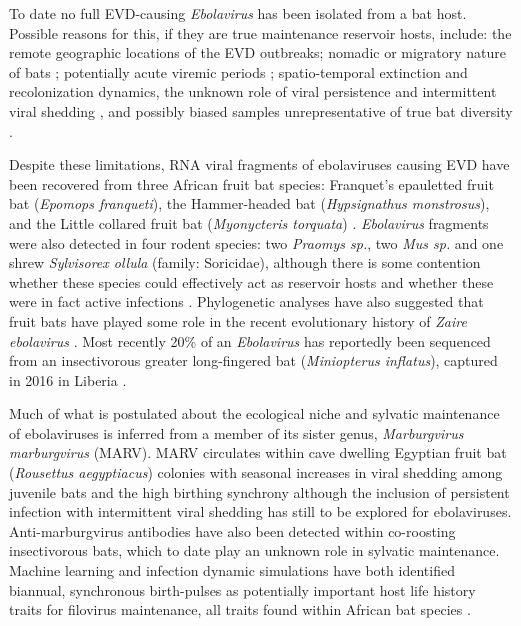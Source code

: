 \documentclass[a4paper,twoside, onecolumn]{article}
\begin{document}
	To date no full EVD-causing \textit{Ebolavirus} has been isolated from a bat host. Possible reasons for this, if they are true maintenance reservoir hosts, include: the remote geographic locations of the EVD outbreaks; nomadic or migratory nature of bats \cite{Nowak1994}; potentially acute viremic periods \cite{Swanepoel1996}; spatio-temporal extinction and recolonization dynamics, the unknown role of viral persistence and intermittent viral shedding \cite{Schuh2017}, and possibly biased samples unrepresentative of true bat diversity \cite{Leendertz2016}.\par 
	Despite these limitations, RNA viral fragments of ebolaviruses causing EVD have been recovered from three African fruit bat species: Franquet's epauletted fruit bat (\textit{Epomops franqueti}), the Hammer-headed bat (\textit{Hypsignathus monstrosus}), and the Little collared fruit bat (\textit{Myonycteris torquata}) \cite{Leroy2005}. \textit{Ebolavirus} fragments were also detected in four rodent species: two \textit{Praomys sp.}, two \textit{Mus sp.} and one shrew \textit{Sylvisorex ollula} (family: Soricidae)\cite{Morvan1999}, although there is some contention whether these species could effectively act as reservoir hosts \cite{Swanepoel1996} and whether these were in fact active infections \cite{Taylor2010}. Phylogenetic analyses have also suggested that fruit bats have played some role in the recent evolutionary history of \textit{Zaire ebolavirus} \cite{Walsh2005,Biek2006}. Most recently 20\% of an \textit{Ebolavirus} has reportedly been sequenced from an insectivorous greater long-fingered bat (\textit{Miniopterus inflatus}), captured in 2016 in Liberia \cite{Kupferschmidt2019}.\par
	Much of what is postulated about the ecological niche and sylvatic maintenance of ebolaviruses is inferred from a member of its sister genus, \textit{Marburgvirus marburgvirus} (MARV). MARV circulates within cave dwelling Egyptian fruit bat (\textit{Rousettus aegyptiacus}) colonies with seasonal increases in viral shedding among juvenile bats and the high birthing synchrony \cite{Amman2012} although the inclusion of persistent infection with intermittent viral shedding has still to be explored for ebolaviruses. Anti-marburgvirus antibodies have also been detected within co-roosting insectivorous bats, which to date play an unknown role in sylvatic maintenance. Machine learning and infection dynamic simulations have both identified biannual, synchronous birth-pulses as potentially important host life history traits for filovirus maintenance, all traits found within African bat species \cite{Han2016,Hayman2015}.\par
\end{document}
